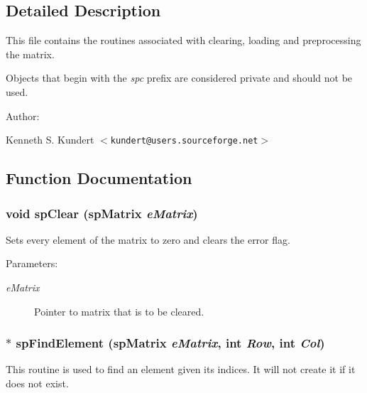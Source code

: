 \subsection{Detailed Description}
 This file contains the routines associated with clearing, loading and preprocessing the matrix.

Objects that begin with the {\em spc} prefix are considered private and should not be used.

\begin{Desc}
\item[Author: ]\par
 Kenneth S. Kundert $<${\tt kundert@users.sourceforge.net}$>$\end{Desc}


\subsection{Function Documentation}
\subsubsection{\setlength{\rightskip}{0pt plus 5cm}void sp\-Clear ({\bf sp\-Matrix} {\em e\-Matrix})}\label{spBuild_8c_a10}


Sets every element of the matrix to zero and clears the error flag.\begin{Desc}
\item[Parameters: ]\par
\begin{description}
\item[{\em 
e\-Matrix}]Pointer to matrix that is to be cleared. \end{description}
\end{Desc}
\subsubsection{$\ast$ sp\-Find\-Element ({\bf sp\-Matrix} {\em e\-Matrix}, int {\em Row}, int {\em Col})}\label{spBuild_8c_a11}


This routine is used to find an element given its indices. It will not create it if it does not exist.

